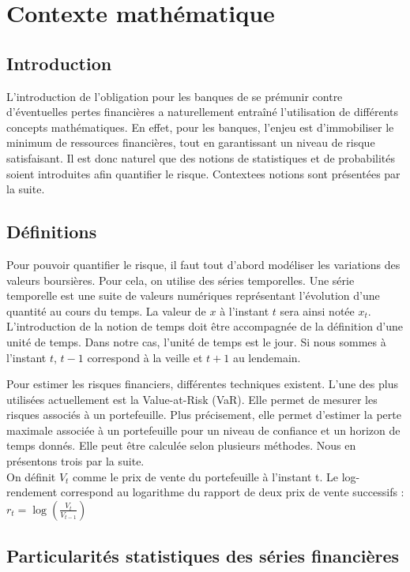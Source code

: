 \chapter{Contexte mathématique}

	\section{Introduction}

	L’introduction de l’obligation pour les banques de se prémunir contre d’éventuelles pertes financières a naturellement entraîné l’utilisation de différents concepts mathématiques. En effet, pour les banques, l’enjeu est d’immobiliser le minimum de ressources financières, tout en garantissant un niveau de risque satisfaisant. Il est donc naturel que des notions de statistiques et de probabilités soient introduites afin quantifier le risque. Contextees notions sont présentées par la suite.


	\section{Définitions}

		Pour pouvoir quantifier le risque, il faut tout d’abord modéliser les variations des valeurs boursières. Pour cela, on utilise des séries temporelles. Une série temporelle est une suite de valeurs numériques représentant l'évolution d'une quantité au cours du temps. La valeur de $x$ à l’instant $t$ sera ainsi notée $x_t$. L’introduction de la notion de temps doit être accompagnée de la définition d’une unité de temps. Dans notre cas, l’unité de temps est le jour. Si nous sommes à l’instant $t$, $t-1$ correspond à la veille et $t+1$ au lendemain.

		Pour estimer les risques financiers, différentes techniques existent. L'une des plus utilisées actuellement est la Value-at-Risk (VaR). Elle permet de mesurer les risques associés à un \gls{portefeuille}.
		Plus précisement, elle permet d'estimer la perte maximale associée à un portefeuille pour un niveau de confiance et un horizon de temps donnés. Elle peut être calculée selon plusieurs méthodes. Nous en présentons trois par la suite.\\
		On définit $V_t$ comme le prix de vente du \gls{portefeuille} à l'instant t. Le log-rendement correspond au logarithme du rapport de deux prix de vente successifs :
		$r_t = \log\left(\frac{V_t}{V_{t-1}}\right)$


	\section{Particularités statistiques des séries financières}

